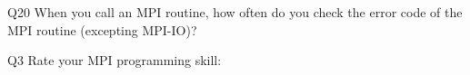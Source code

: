 \begin{description}%
\item{Q20} When you call an MPI routine, how often do you check the error code of the MPI routine  (excepting MPI-IO)?%
\item{Q3} Rate your MPI programming skill:%
\end{description}%
